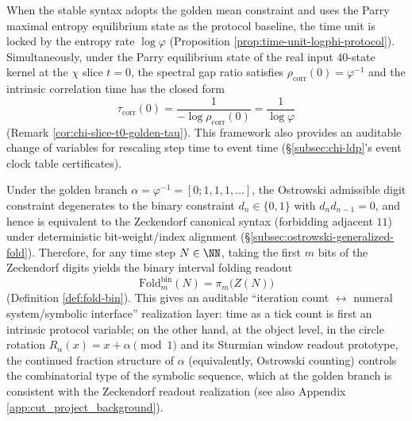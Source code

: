\begin{enumerate}
  \begin{corollary}
  \label{cor:terminal-tau-corr-logphi}
  When the stable syntax adopts the golden mean constraint and uses the Parry maximal entropy equilibrium state as the protocol baseline, the time unit is locked by the entropy rate \(\log\varphi\) (Proposition \ref{prop:time-unit-logphi-protocol}).
  Simultaneously, under the Parry equilibrium state of the real input \(40\)-state kernel at the \(\chi\) slice \(t=0\), the spectral gap ratio satisfies
  \(
  \rho_{\mathrm{corr}}(0)=\varphi^{-1}
  \)
  and the intrinsic correlation time has the closed form
  \[
  \tau_{\mathrm{corr}}(0)=\frac{1}{-\log\rho_{\mathrm{corr}}(0)}=\frac{1}{\log\varphi}
  \]
  (Remark \ref{cor:chi-slice-t0-golden-tau}).
  This framework also provides an auditable change of variables for rescaling step time to event time (\S\ref{subsec:chi-ldp}'s event clock table certificates).
  \end{corollary}

  \begin{corollary}\label{cor:terminal-ostrowski-zeckendorf-binfold}
  Under the golden branch \(\alpha=\varphi^{-1}=[0;1,1,1,\dots]\), the Ostrowski admissible digit constraint degenerates to the binary constraint \(d_n\in\{0,1\}\) with \(d_n d_{n-1}=0\), and hence is equivalent to the Zeckendorf canonical syntax (forbidding adjacent \(11\)) under deterministic bit-weight/index alignment (\S\ref{subsec:ostrowski-generalized-fold}).
  Therefore, for any time step \(N\in\NN\), taking the first \(m\) bits of the Zeckendorf digits yields the binary interval folding readout
  \[
  \mathrm{Fold}^{\mathrm{bin}}_m(N)=\pi_m\bigl(Z(N)\bigr)
  \]
  (Definition \ref{def:fold-bin}).
  This gives an auditable ``iteration count \(\leftrightarrow\) numeral system/symbolic interface'' realization layer: time as a tick count is first an intrinsic protocol variable; on the other hand, at the object level, in the circle rotation \(R_\alpha(x)=x+\alpha\pmod 1\) and its Sturmian window readout prototype, the continued fraction structure of \(\alpha\) (equivalently, Ostrowski counting) controls the combinatorial type of the symbolic sequence, which at the golden branch is consistent with the Zeckendorf readout realization (see also Appendix \ref{app:cut_project_background}).
  \end{corollary}


\end{enumerate}
